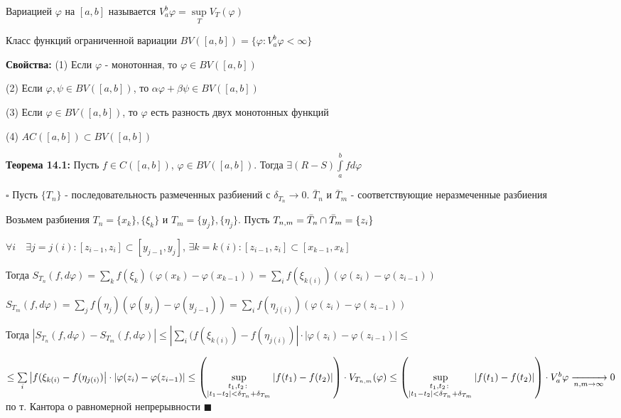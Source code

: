 \documentclass[a4paper]{report}
\newcommand*{\hm}[1]{#1\nobreak\discretionary{}%
            {\hbox{$\mathsurround=0pt #1$}}{}}
\begin{document}
Вариацией $\varphi$ на $[a,b]$ называется $V_a^b\varphi=\sup\limits_T V_T(\varphi)$

Класс функций ограниченной вариации $BV([a,b])=\{\varphi\colon V_a^b\varphi<\infty\}$
\bigskip

\noindent\textbf{Свойства:} (1) Если $\varphi$ - монотонная, то $\varphi\in BV([a,b])$

(2) Если $\varphi,\psi\in BV([a,b])$, то $\alpha\varphi+\beta\psi\in BV([a,b])$

(3) Если $\varphi\in BV([a,b])$, то $\varphi$ есть разность двух монотонных функций

(4) $AC([a,b])\subset BV([a,b])$
\bigskip

\noindent\textbf{Теорема 14.1:} Пусть $f\in C([a,b])$, $\varphi\in BV([a,b])$. Тогда $\exists (R-S)\displaystyle\int\limits_a^bfd\varphi$

\noindent $\square$ Пусть $\{T_n\}$ - последовательность размеченных разбиений с $\delta_{T_n}\to0$. $\bar T_n$ и $\bar T_m$ - соответствующие неразмеченные разбиения

Возьмем разбиения $T_n=\{x_k\},\{\xi_k\}$ и $T_m=\{y_j\},\{\eta_j\}$. Пусть $T_{n,m}\hm=\bar T_n\cap\bar T_m=\{z_i\}$

$\forall i\quad\exists j=j(i)\colon[z_{i-1},z_i]\subset[y_{j-1},y_j]$, $\exists k=k(i)\colon[z_{i-1},z_i]\subset[x_{k-1},x_k]$

Тогда $S_{T_n}(f,d\varphi)=\sum\limits_k f(\xi_k)\left(\varphi(x_k)-\varphi(x_{k-1})\right)=\sum\limits_i f(\xi_{k(i)})\left(\varphi(z_i)-\varphi(z_{i-1})\right)$

$S_{T_m}(f,d\varphi)=\sum\limits_j f(\eta_j)\left(\varphi(y_j)-\varphi(y_{j-1})\right)=\sum\limits_i f(\eta_{j(i)})\left(\varphi(z_i)-\varphi(z_{i-1})\right)$

Тогда $|S_{T_n}(f,d\varphi)-S_{T_m}(f,d\varphi)|\le\left|\sum\limits_i(f(\xi_{k(i)})-f(\eta_{j(i)})\right|\cdot|\varphi(z_i)-\varphi(z_{i-1})|\le$

\noindent$\le\sum\limits_i\left|f(\xi_{k(i)}-f(\eta_{j(i)})\right|\cdot\left|\varphi(z_i)-\varphi(z_{i-1})\right|\le\left(\sup\limits_{\substack{t_1,t_2\colon\\|t_1-t_2|<\delta_{T_n}+\delta_{T_m}}}|f(t_1)-f(t_2)|\right)\hm\cdot V_{T_{n,m}}(\varphi)\le\left(\sup\limits_{\substack{t_1,t_2\colon\\|t_1-t_2|<\delta_{T_n}+\delta_{T_m}}}|f(t_1)-f(t_2)|\right)\cdot V_a^b\varphi\xrightarrow[n,m\to\infty]{}0$ по т. Кантора о равномерной непрерывности $\blacksquare$
\bigskip
\end{document}
